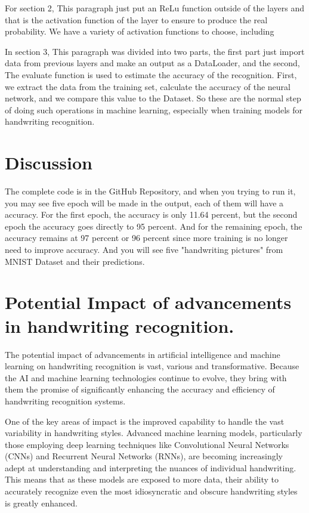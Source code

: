 \documentclass[12pt]{article}
\begin{document}
For section 2, This paragraph just put an ReLu function outside of the layers and that is the activation function of the layer to ensure to produce the real probability. We have a variety of activation functions to choose, including 

In section 3, This paragraph was divided into two parts, the first part just import data from previous layers and make an output as a DataLoader, and the second, The evaluate function is used to estimate the accuracy of the recognition. First, we extract the data from the training set, calculate the accuracy of the neural network, and we compare this value to the Dataset. So these are the normal step of doing such operations in machine learning, especially when training models for handwriting recognition. 

\section*{Discussion}
The complete code is in the GitHub Repository, and when you trying to run it, you may see five epoch will be made in the output, each of them will have a accuracy. For the first epoch, the accuracy is only 11.64 percent, but the second epoch the accuracy goes directly to 95 percent. And for the remaining epoch, the accuracy remains at 97 percent or 96 percent since more training is no longer need to improve accuracy. And you will see five "handwriting pictures" from MNIST Dataset and their predictions. 

\section* {Potential Impact of advancements in handwriting recognition.}
The potential impact of advancements in artificial intelligence and machine learning on handwriting recognition is vast, various and transformative. Because the AI and machine learning technologies continue to evolve, they bring with them the promise of significantly enhancing the accuracy and efficiency of handwriting recognition systems. 

One of the key areas of impact is the improved capability to handle the vast variability in handwriting styles. Advanced machine learning models, particularly those employing deep learning techniques like Convolutional Neural Networks (CNNs) and Recurrent Neural Networks (RNNs), are becoming increasingly adept at understanding and interpreting the nuances of individual handwriting. This means that as these models are exposed to more data, their ability to accurately recognize even the most idiosyncratic and obscure handwriting styles is greatly enhanced.
\end{document}

